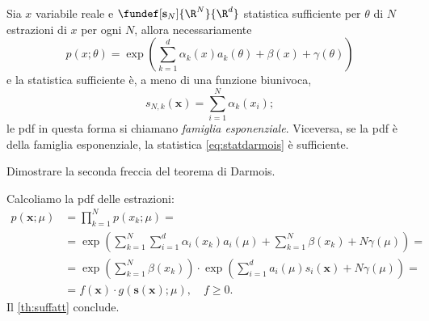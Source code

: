 \begin{fact}
	\label{th:darmois}
	Sia $x$ variabile reale e $\fundef[\mathbf s_N]{\R^N}{\R^d}$ statistica sufficiente per $\theta$ di $N$ estrazioni di $x$ per ogni $N$,
	allora necessariamente
	\begin{equation*}
		p(x;\theta) =
		\exp \left( \sum_{k=1}^d \alpha_k(x)a_k(\theta) + \beta(x) + \gamma(\theta) \right)
	\end{equation*}
	e la statistica sufficiente è, a meno di una funzione biunivoca,
	\begin{equation}
		\label{eq:statdarmois}
		s_{N,k}(\mathbf x) = \sum_{i=1}^{N} \alpha_k(x_i);
	\end{equation}
	le pdf in questa forma si chiamano \emph{famiglia esponenziale}.
	Viceversa, se la pdf è della famiglia esponenziale, la statistica \eqref{eq:statdarmois} è sufficiente.
\end{fact}

\begin{exercise}
	Dimostrare la seconda freccia del teorema di Darmois.
\end{exercise}

\begin{solution}
	Calcoliamo la pdf delle estrazioni:
	\begin{align*}
		p(\mathbf x;\mu)
		&= \prod_{k=1}^N p(x_k;\mu) = \\
		&= \exp \left( \sum_{k=1}^N \sum_{i=1}^d \alpha_i(x_k)a_i(\mu)
		+ \sum_{k=1}^N \beta(x_k) + N\gamma(\mu) \right) = \\
		&= \exp \left( \sum_{k=1}^N \beta(x_k) \right)
		\cdot \exp \left( \sum_{i=1}^d a_i(\mu)s_i(\mathbf x) + N\gamma(\mu) \right) = \\
		&= f(\mathbf x) \cdot g(\mathbf s(\mathbf x);\mu), \quad f\ge0.
	\end{align*}
	Il \autoref{th:suffatt} conclude.
\end{solution}
